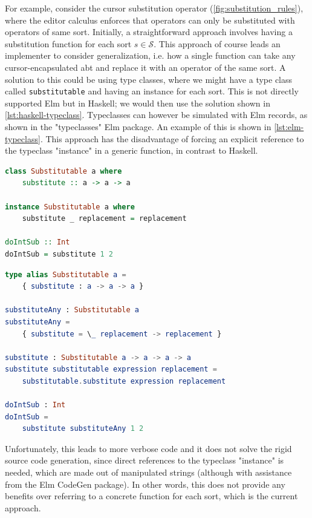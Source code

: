 \documentclass[sigplan,review]{acmart}
\newcommand{\abt}{\textsf{abt}\xspace}
\begin{document}
For example, consider the cursor substitution operator
(\cref{fig:substitution_rules}), where the editor calculus enforces
that operators can only be substituted with operators of same
sort. Initially, a straightforward approach involves having a
substitution function for each sort $s \in \mathcal{S}$.  This
approach of course leads an implementer to consider generalization,
i.e. how a single function can take any cursor-encapsulated \abt and
replace it with an operator of the same sort. A solution to this could
be using type classes, where we might have a type class called
\texttt{substitutable} and having an instance for each sort.  This is
not directly supported Elm but in Haskell; we would then use the
solution shown in \cref{lst:haskell-typeclass}.  Typeclasses can
however be simulated with Elm records, as shown in the "typeclasses"
Elm package\cite{elm-typeclass-package}.  An example of this is shown
in \cref{lst:elm-typeclass}.  This approach has the disadvantage of
forcing an explicit reference to the typeclass "instance" in a generic
function, in contrast to Haskell.

\begin{lstlisting}[language=Haskell,style=inline,caption={Haskell typeclass example},label={lst:haskell-typeclass}]
class Substitutable a where 
    substitute :: a -> a -> a
    
instance Substitutable a where
    substitute _ replacement = replacement

doIntSub :: Int
doIntSub = substitute 1 2 
\end{lstlisting}

\begin{lstlisting}[language=elm,style=inline,caption={Elm typeclass simulation example},label={lst:elm-typeclass}]
type alias Substitutable a =
    { substitute : a -> a -> a }

substituteAny : Substitutable a
substituteAny =
    { substitute = \_ replacement -> replacement }

substitute : Substitutable a -> a -> a -> a
substitute substitutable expression replacement =
    substitutable.substitute expression replacement

doIntSub : Int
doIntSub =
    substitute substituteAny 1 2
\end{lstlisting}

Unfortunately, this leads to more verbose code and it does not solve the rigid source code generation, since direct references to the typeclass "instance" is needed, which are made out of manipulated strings (although with assistance from the Elm CodeGen package). In other words, this
does not provide any benefits over referring to a concrete function for
each sort, which is the current approach.
\end{document}
